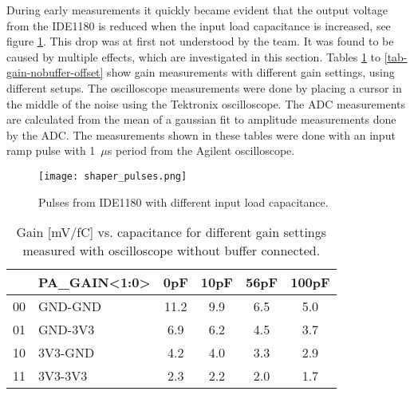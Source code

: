 \documentclass[../main/thesis.tex]{subfiles}
\begin{document}
During early measurements it quickly became evident that the output voltage from the IDE1180 is reduced when the input load capacitance is increased, see figure \ref{fig-gain-drop}. This drop was at first not understood by the team. It was found to be caused by multiple effects, which are investigated in this section. Tables \ref{tab-gain-nobuffer} to \ref{tab-gain-nobuffer-offset} show gain measurements with different gain settings, using different setups. The oscilloscope measurements were done by placing a cursor in the middle of the noise using the Tektronix oscilloscope. The ADC measurements are calculated from the mean of a gaussian fit to amplitude measurements done by the ADC. The measurements shown in these tables were done with an input ramp pulse with 1~$\mu$s period from the Agilent oscilloscope.

\begin{figure}%
	\centering
	\texttt{[image: shaper\_pulses.png]}
	\caption{Pulses from IDE1180 with different input load capacitance.}
	\label{fig-gain-drop}
\end{figure} 

\begin{table}[h!] %
	\begin{center}
		\caption{Gain [mV/fC] vs. capacitance for different gain settings measured with oscilloscope without buffer connected.}
		\label{tab-gain-nobuffer}
		\begin{tabular}{clcccc}\toprule
			&\textbf{PA\_GAIN<1:0>} & \textbf{0pF}  & \textbf{10pF} & \textbf{56pF} & \textbf{100pF} \\ \midrule
			00&GND-GND     & 11.2 & 9.9 & 6.5  & 5.0   \\
			01&GND-3V3     & 6.9    & 6.2  & 4.5  & 3.7   \\
			10&3V3-GND     & 4.2  & 4.0  & 3.3  & 2.9     \\
			11&3V3-3V3     & 2.3  & 2.2  & 2.0    & 1.7 \\ \bottomrule
		\end{tabular}
	\end{center}
\end{table}
\end{document}
